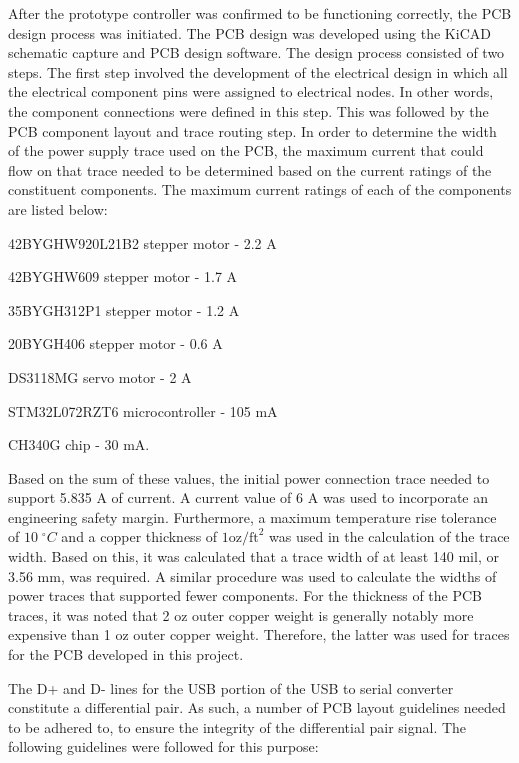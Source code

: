 After the prototype controller was confirmed to be functioning correctly, the PCB design process was initiated. The PCB design was developed using the KiCAD schematic capture and PCB design software. The design process consisted of two steps. The first step involved the development of the electrical design in which all the electrical component pins were assigned to electrical nodes. In other words, the component connections were defined in this step. This was followed by the PCB component layout and trace routing step. In order to determine the width of the power supply trace used on the PCB, the maximum current that could flow on that trace needed to be determined based on the current ratings of the constituent components. The maximum current ratings of each of the components are listed below:

\begin{compactitem}
	\item 42BYGHW920L21B2 stepper motor - 2.2 A
	\item 42BYGHW609 stepper motor - 1.7 A
	\item 35BYGH312P1 stepper motor - 1.2 A
	\item 20BYGH406 stepper motor - 0.6 A
	\item DS3118MG servo motor - 2 A
	\item STM32L072RZT6 microcontroller - 105 mA
	\item CH340G chip - 30 mA.
\end{compactitem}

Based on the sum of these values, the initial power connection trace needed to support 5.835 A of current. A current value of 6 A was used to incorporate an engineering safety margin. Furthermore, a maximum temperature rise tolerance of $10\;^{\circ}C$ and a copper thickness of $1 \text{oz/ft}^2$ was used in the calculation of the trace width. Based on this, it was calculated that a trace width of at least 140 mil, or 3.56 mm, was required. A similar procedure was used to calculate the widths of power traces that supported fewer components. For the thickness of the PCB traces, it was noted that 2 oz outer copper weight is generally notably more expensive than 1 oz outer copper weight. Therefore, the latter was used for traces for the PCB developed in this project. 


The D+ and D- lines for the USB portion of the USB to serial converter constitute a differential pair. As such, a number of PCB layout guidelines needed to be adhered to, to ensure the integrity of the differential pair signal. The following guidelines were followed for this purpose:

